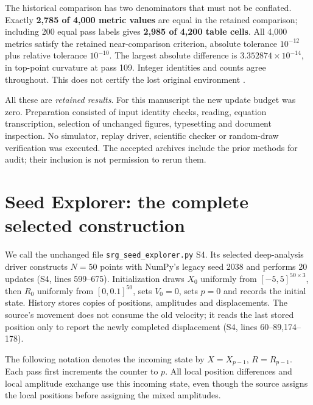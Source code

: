 \documentclass[11pt,a4paper]{article}
\newcommand{\src}[2]{\textsf{#1}, lines #2}
\begin{document}
The historical comparison has two denominators that must not be conflated. Exactly \textbf{2,785 of 4,000 metric values} are equal in the retained comparison; including 200 equal pass labels gives \textbf{2,985 of 4,200 table cells}. All 4,000 metrics satisfy the retained near-comparison criterion, absolute tolerance $10^{-12}$ plus relative tolerance $10^{-10}$. The largest absolute difference is $3.352874\times10^{-14}$, in top-point curvature at pass 109. Integer identities and counts agree throughout. This does not certify the lost original environment \cite{verification5}.

All these are \emph{retained results}. For this manuscript the new update budget was zero. Preparation consisted of input identity checks, reading, equation transcription, selection of unchanged figures, typesetting and document inspection. No simulator, replay driver, scientific checker or random-draw verification was executed. The accepted archives include the prior methods for audit; their inclusion is not permission to rerun them.

\section{Seed Explorer: the complete selected construction}
\label{sec:s4construction}
We call the unchanged file \texttt{srg\_seed\_explorer.py} \textsf{S4}. Its selected deep-analysis driver constructs $N=50$ points with NumPy's legacy seed 2038 and performs 20 updates (\src{S4}{599--675}). Initialization draws $X_0$ uniformly from $[-5,5]^{50\times3}$, then $R_0$ uniformly from $[0,0.1]^{50}$, sets $V_0=0$, sets $p=0$ and records the initial state. History stores copies of positions, amplitudes and displacements. The source's movement does not consume the old velocity; it reads the last stored position only to report the newly completed displacement (\src{S4}{60--89,174--178}).

The following notation denotes the incoming state by $X=X_{p-1}$, $R=R_{p-1}$. Each pass first increments the counter to $p$. All local position differences and local amplitude exchange use this incoming state, even though the source assigns the local positions before assigning the mixed amplitudes.
\end{document}
